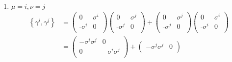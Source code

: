\documentclass{exercise}
\begin{document}
\begin{enumerate}
{\begin{enumerate}
\begin{align}
\begin{pmatrix}
                0       & \text{-}\mathbb{1} \\
            \end{pmatrix}
            &=    \begin{pmatrix}
                0 & \sigma^i \\
                \sigma^i & 0 \\
            \end{pmatrix}
            +
            \begin{pmatrix}
                0 & \text{-}\sigma^i \\
                \text{-}\sigma^i & 0 \\
            \end{pmatrix} = 0
        \end{align}
        \item $\mu = i, \nu = j$
        \begin{align}
            \left\{ \gamma^i, \gamma^j\right\} &= \begin{pmatrix}
                0 & \sigma^i \\
                \text{-}\sigma^i & 0 \\
            \end{pmatrix}
            \begin{pmatrix}
                0 & \sigma^j \\
                \text{-}\sigma^j & 0 \\
            \end{pmatrix} +
            \begin{pmatrix}
                0 & \sigma^j \\
                \text{-}\sigma^j & 0 \\
            \end{pmatrix}
            \begin{pmatrix}
                0 & \sigma^i \\
                \text{-}\sigma^i & 0 \\
            \end{pmatrix}\\
             &= \begin{pmatrix}
                -\sigma^i \sigma^j& 0 \\
                0 & -\sigma^i \sigma^j \\
            \end{pmatrix} +
            \begin{pmatrix}
                -\sigma^j \sigma^j& 0 \\

\end{pmatrix}
\end{align}
\end{enumerate}}
\end{enumerate}
\end{document}

